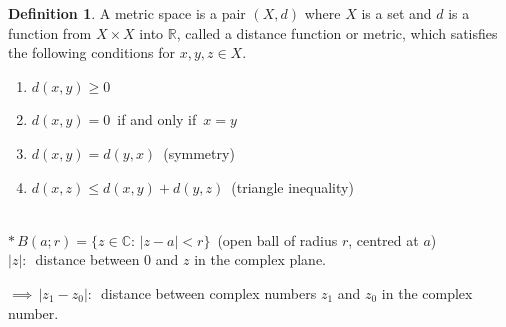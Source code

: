 \documentclass[11pt,a4paper]{article}
\theoremstyle{definition}
\newtheorem{definition}[thm]{Definition}
\begin{document}
\begin{definition}
A metric space is a pair $(X,d)$ where $X$ is a set and $d$ is a function from $X\times X$ into $\mathbb{R}$, called a distance function or metric, which satisfies the following conditions for $x,y,  z \in X$.
\begin{enumerate}
\item $d(x,y) \geq 0$

\item $d(x,y)  = 0\,$ if and only if $\, x = y$

\item $d(x,y) = d(y,x)\,$ (symmetry)

\item $d(x,z) \leq d(x,y) + d(y,z)\,$ (triangle inequality)\\\\
\end{enumerate}





$*\, B(a;r) = \big\{z \in \mathbb{C}:\, \left|z - a\right| < r\big\}\,$ (open ball of radius $r$, centred at $a$)\\



$\left|z\right|:\,$ distance between 0 and $z$ in the complex plane.



\begin{figure}[H]
\centering
{}
\end{figure}













$\implies \, \left|z_1 - z_0\right|:\,$ distance between complex numbers $z_1$ and $z_0$ in the complex number.


\begin{figure}[H]
\centering
{}
\end{figure}
\end{definition}
\end{document}
